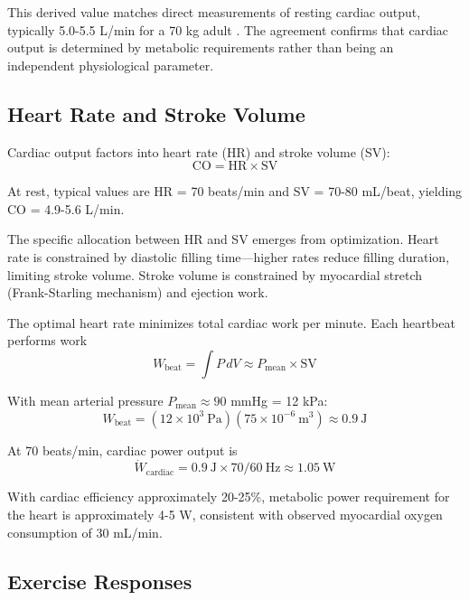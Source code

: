This derived value matches direct measurements of resting cardiac output, typically 5.0-5.5 L/min for a 70 kg adult \cite{holt1968hemodynamic}. The agreement confirms that cardiac output is determined by metabolic requirements rather than being an independent physiological parameter.

\subsection{Heart Rate and Stroke Volume}

Cardiac output factors into heart rate (HR) and stroke volume (SV):
\begin{equation}
\mathrm{CO} = \mathrm{HR} \times \mathrm{SV}
\end{equation}

At rest, typical values are HR = 70 beats/min and SV = 70-80 mL/beat, yielding CO = 4.9-5.6 L/min.

The specific allocation between HR and SV emerges from optimization. Heart rate is constrained by diastolic filling time—higher rates reduce filling duration, limiting stroke volume. Stroke volume is constrained by myocardial stretch (Frank-Starling mechanism) and ejection work.

The optimal heart rate minimizes total cardiac work per minute. Each heartbeat performs work
\begin{equation}
W_{\mathrm{beat}} = \int P \, dV \approx P_{\mathrm{mean}} \times \mathrm{SV}
\end{equation}

With mean arterial pressure $P_{\mathrm{mean}} \approx 90$ mmHg = 12 kPa:
\begin{equation}
W_{\mathrm{beat}} = (12 \times 10^{3}~\mathrm{Pa})(75 \times 10^{-6}~\mathrm{m}^{3}) \approx 0.9~\mathrm{J}
\end{equation}

At 70 beats/min, cardiac power output is
\begin{equation}
\dot{W}_{\mathrm{cardiac}} = 0.9~\mathrm{J} \times 70/60~\mathrm{Hz} \approx 1.05~\mathrm{W}
\end{equation}

With cardiac efficiency approximately 20-25\%, metabolic power requirement for the heart is approximately 4-5 W, consistent with observed myocardial oxygen consumption of 30 mL/min.

\subsection{Exercise Responses}

